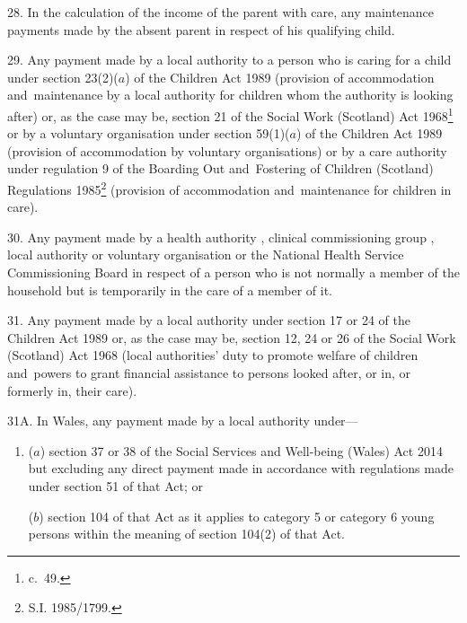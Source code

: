 \documentclass[12pt,a4paper]{article}
\begin{document}
\medskip

28.  In the calculation of the income of the parent with care, any maintenance payments made by the absent parent in respect of his qualifying child.

\medskip

29.  Any payment made by a local authority to a person who is caring for a child under section 23(2)($a$) of the Children Act 1989 (provision of accommodation and~maintenance by a local authority for children whom the authority is looking after) or, as the case may be, section 21 of the Social Work (Scotland) Act 1968\footnote{ c.~49.} or by a voluntary organisation under section 59(1)($a$) of the Children Act 1989 (provision of accommodation by voluntary organisations) or by a care authority under regulation 9 of the Boarding Out and~Fostering of Children (Scotland) Regulations 1985\footnote{\frenchspacing S.I. 1985/1799.} (provision of accommodation and~maintenance for children in care).

\medskip

30.  Any payment made by a health authority%
, 
clinical commissioning group%
, local authority or voluntary organisation 
or the National Health Service Commissioning Board  %
in respect of a person who is not normally a member of the household but is temporarily in the care of a member of it.


\medskip

31.  Any payment made by a local authority under section 17 or 24 of the Children Act 1989 or, as the case may be, section 12, 24 or 26 of the Social Work (Scotland) Act 1968 (local authorities' duty to promote welfare of children and~powers to grant financial assistance to persons looked after, or in, or formerly in, their care).

\medskip

31A.  In Wales, any payment made by a local authority under—
\begin{enumerate}
\item []
($a$) section 37 or 38 of the Social Services and Well-being (Wales) Act 2014 but excluding any direct payment made in accordance with regulations made under section 51 of that Act; or

($b$) section 104 of that Act as it applies to category 5 or category 6 young persons within the meaning of section 104(2) of that Act.
\end{enumerate}
\end{document}

